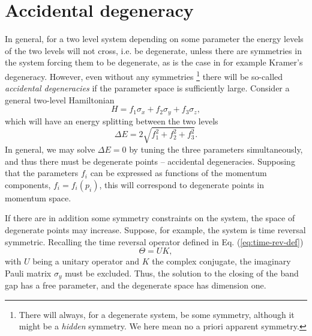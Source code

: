 \section{Accidental degeneracy}
\label{sec:accidental-degeneracy}
In general, for a two level system depending on some parameter the energy levels of the two levels will not cross, i.e. be degenerate, unless there are symmetries in the system forcing them to be degenerate, as is the case in for example Kramer's degeneracy.
However, even without any symmetries
\footnote{There will always, for a degenerate system, be some symmetry, although it might be a \emph{hidden} symmetry. We here mean no a priori apparent symmetry.}
there will be so-called \emph{accidental degeneracies} if the parameter space is sufficiently large.
Consider a general two-level Hamiltonian
\begin{equation}
  H = f_1 \sigma_x + f_2 \sigma_y + f_3 \sigma_z,
\end{equation}
which will have an energy splitting between the two levels
\begin{equation}
  \Delta E = 2 \sqrt{
    f_1^2 + f_2^2 + f_3^2
  }.
\end{equation}
In general, we may solve $\Delta E = 0$ by tuning the three parameters simultaneously, and thus there must be degenerate points -- accidental degeneracies.
Supposing that the parameters $f_i$ can be expressed as functions of the momentum components, $f_i =f_i(p_i)$, this will correspond to degenerate points in momentum space.

If there are in addition some symmetry constraints on the system, the space of degenerate points may increase.
Suppose, for example, the system is time reversal symmetric.
Recalling the time reversal operator defined in Eq. (\ref{eq:time-rev-def})
$$
\Theta = UK,
$$
with $U$ being a unitary operator and $K$ the complex conjugate, the imaginary Pauli matrix $\sigma_y$ must be excluded.
Thus, the solution to the closing of the band gap has a free parameter, and the degenerate space has dimension one.

